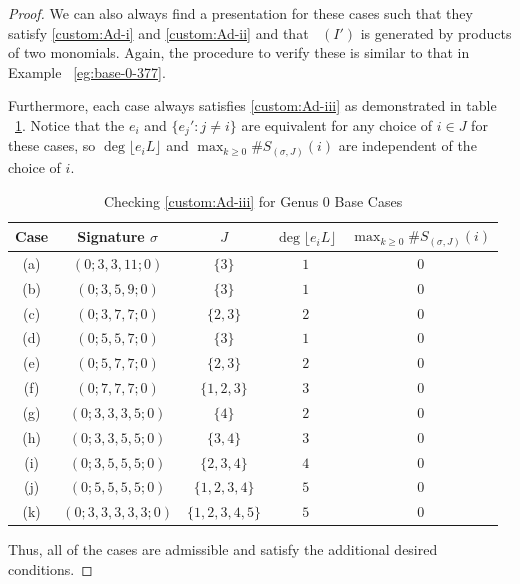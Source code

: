 \documentclass{amsart}
\theoremstyle{plain}
\theoremstyle{definition}
\theoremstyle{remark}
\numberwithin{equation}{section}
\newcommand{\halfcan}{L}
\DeclareMathOperator{\initial}{in_\prec}
\begin{document}
\begin{proof}
We can also always find a presentation for these cases such that
they satisfy \ref{custom:Ad-i} and \ref{custom:Ad-ii} and that $\initial(I')$ is
generated by products of two monomials. Again, the procedure to
verify these is similar to that in Example
~\ref{eg:base-0-377}.

Furthermore, each case always satisfies \ref{custom:Ad-iii} as demonstrated in table ~\ref{table:g-0-base-cases-admissibility}.
Notice that the $e_i$ and $\{e_j' : j \neq i\}$ are equivalent
for any choice of $i \in J$ for these cases, so $\deg \lfloor e_i \halfcan
\rfloor$ and $\max_{k \geq 0} \#S_{(\sigma, J)}(i)$ are
independent of the choice of $i$.

\begin{table}
\begin{tabular}
	{| c | c | c || c | c |}
	\hline
	Case & Signature $\sigma$ & $J$ & $\deg \lfloor e_i L \rfloor$ &
	$\max_{k \geq 0} \#S_{(\sigma, J)}(i)$ \\
	\hline
	\hline

	(a) & $(0; 3, 3, 11; 0)$ & $\{3\}$ & $1$ & $0$ \\	\hline
	
	(b) & $(0; 3, 5, 9; 0)$ & $\{3\}$ & $1$ & $0$ \\ \hline
	
	(c) & $(0; 3, 7, 7; 0)$ & $\{2, 3\}$ & $2$ & $0$ \\ \hline
	
	(d) & $(0; 5, 5, 7; 0)$ & $\{3\}$ & $1$ & $0$ \\ \hline
	
	(e) & $(0; 5, 7, 7; 0)$ & $\{2, 3\}$ & $2$ & $0$ \\ \hline

	(f) & $(0; 7, 7, 7; 0)$ & $\{1, 2, 3\}$ & $3$ & $0$ \\ \hline

	(g) & $(0; 3, 3, 3, 5; 0)$ & $\{4\}$ & $2$ & $0$ \\ \hline
	
	(h) & $(0; 3, 3, 5, 5; 0)$ & $\{3, 4\}$ & $3$ & $0$ \\ \hline
	
	(i) & $(0; 3, 5, 5, 5; 0)$ & $\{2, 3, 4\}$ & $4$ & $0$ \\ \hline
	
	(j) & $(0; 5, 5, 5, 5; 0)$ & $\{1, 2, 3, 4\}$ & $5$ & $0$ \\ \hline

	(k) & $(0; 3, 3, 3, 3, 3; 0)$ & $\{1, 2, 3, 4, 5\}$ & $5$ & $0$ \\ \hline
\end{tabular}	

\caption{Checking \ref{custom:Ad-iii} for Genus 0 Base Cases}
\label{table:g-0-base-cases-admissibility}
\end{table}

Thus, all of the cases are admissible and satisfy the additional
desired conditions.
\end{proof}
\end{document}
